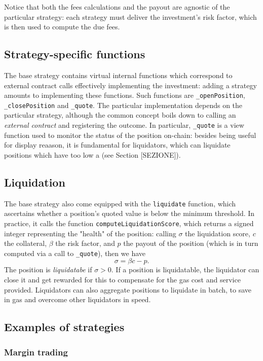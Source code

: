 \documentclass[a4paper,10 pt]{article}
\theoremstyle{definition}
\begin{document}
Notice that both the fees calculations and the payout are agnostic of the particular strategy: each strategy must deliver the investment's risk factor, which is then used to compute the due fees.

\subsection{Strategy-specific functions}

The base strategy contains virtual internal functions which correspond to external contract calls effectively implementing the investment: adding a strategy amounts to implementing these functions. Such functions are \verb|_openPosition|, \verb|_closePosition| and \verb|_quote|. The particular implementation depends on the particular strategy, although the common concept boils down to calling an {\it external contract} and registering the outcome. In particular, \verb|_quote| is a view function used to monitor the status of the position on-chain: besides being useful for display reaason, it is fundamental for liquidators, which can liquidate positions which have too low a  (see Section [SEZIONE]).

\subsection{Liquidation}
The base strategy also come equipped with the \verb|liquidate| function, which ascertains whether a position's quoted value is below the minimum threshold. In practice, it calls the function \verb|computeLiquidationScore|, which returns a signed integer representing the "health" of the position: calling $\sigma$ the liquidation score, $c$ the collateral, $\beta$ the risk factor, and $p$ the payout of the position (which is in turn computed via a call to \verb|_quote|), then we have
$$\sigma = \beta c - p.$$
The position is {\it liquidatabe} if $\sigma > 0$. If a position is liquidatable, the liquidator can close it and get rewarded for this to compensate for the gas cost and service provided. Liquidators can also aggregate positions to liquidate in batch, to save in gas and overcome other liquidators in speed.

\subsection{Examples of strategies}

\subsubsection{Margin trading}
\end{document}
